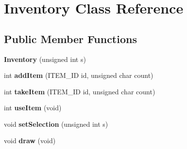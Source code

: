 \hypertarget{classInventory}{}\section{Inventory Class Reference}
\label{classInventory}
\subsection*{Public Member Functions}
\begin{DoxyCompactItemize}
\item 
\hypertarget{classInventory_a426d86c552dfa7c3350a4e5cac20be44}{}{\bfseries Inventory} (unsigned int s)\label{classInventory_a426d86c552dfa7c3350a4e5cac20be44}

\item 
\hypertarget{classInventory_ada97bb76c3597bbed728ec2ca253c395}{}int {\bfseries add\+Item} (I\+T\+E\+M\+\_\+\+I\+D id, unsigned char count)\label{classInventory_ada97bb76c3597bbed728ec2ca253c395}

\item 
\hypertarget{classInventory_ad15654bd6697d1a7efd368f95a08ceb9}{}int {\bfseries take\+Item} (I\+T\+E\+M\+\_\+\+I\+D id, unsigned char count)\label{classInventory_ad15654bd6697d1a7efd368f95a08ceb9}

\item 
\hypertarget{classInventory_a8ba9b0c4985c76d6ee8305f894281703}{}int {\bfseries use\+Item} (void)\label{classInventory_a8ba9b0c4985c76d6ee8305f894281703}

\item 
\hypertarget{classInventory_a832820a6fbc52955c35c9c33514817d3}{}void {\bfseries set\+Selection} (unsigned int s)\label{classInventory_a832820a6fbc52955c35c9c33514817d3}

\item 
\hypertarget{classInventory_acb3036240abe5fe05fc1980904924528}{}void {\bfseries draw} (void)\label{classInventory_acb3036240abe5fe05fc1980904924528}

\end{DoxyCompactItemize}
